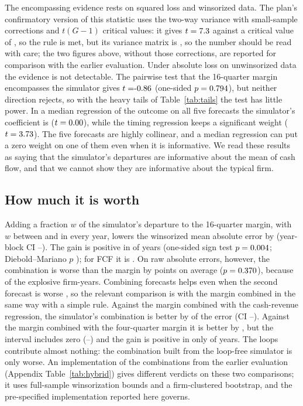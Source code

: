 \documentclass[preprint,12pt,authoryear]{elsarticle}
\begin{document}
The encompassing evidence rests on squared loss and winsorized data. The plan's confirmatory version of this statistic uses the two-way variance with small-sample corrections and $t(G-1)$ critical values: it gives $t=7.3$ against a critical value of \EncTGOneCrit, so the rule is met, but its variance matrix is \EncTGOnePsd, so the number should be read with care; the two figures above, without those corrections, are reported for comparison with the earlier evaluation. Under absolute loss on unwinsorized data the evidence is not detectable. The pairwise test that the 16-quarter margin encompasses the simulator gives $t=\EncAbsSixteen$ (one-sided $p=0.794$), but neither direction rejects, so with the heavy tails of Table~\ref{tab:tails} the test has little power. In a median regression of the outcome on all five forecasts the simulator's coefficient is \EncLadCoef{} ($t=0.00$), while the timing regression keeps a significant weight ($t=3.73$). The five forecasts are highly collinear, and a median regression can put a zero weight on one of them even when it is informative. We read these results as saying that the simulator's departures are informative about the mean of cash flow, and that we cannot show they are informative about the typical firm.

\subsection{How much it is worth}
Adding a fraction $w$ of the simulator's departure to the 16-quarter margin, with $w$ between \LamMin{} and \LamMax{} in every year, lowers the winsorized mean absolute error by \GainPct{} (year-block CI \GainLo--\GainHi). The gain is positive in \GainPos{} of \GainYears{} years (one-sided sign test $p=0.004$; Diebold--Mariano $p$ \GainDmPrel); for FCF it is \GainFcfPct. On raw absolute errors, however, the combination is worse than the margin by \GainRawMean{} points on average ($p=0.370$), because of the explosive firm-years. Combining forecasts helps even when the second forecast is worse \citep{bates1969,clemen1989,timmermann2006}, so the relevant comparison is with the margin combined in the same way with a simple rule. Against the margin combined with the cash-revenue regression, the simulator's combination is better by \GainRegPct{} of the error (CI \GainRegLo--\GainRegHi). Against the margin combined with the four-quarter margin it is better by \GainFourPct, but the interval includes zero (\GainFourLo--\GainFourHi) and the gain is positive in only \GainFourPos{} of \GainYears{} years. The loops contribute almost nothing: the combination built from the loop-free simulator is only \GainLoopsPct{} worse. An implementation of the combinations from the earlier evaluation (Appendix Table~\ref{tab:hybrid}) gives different verdicts on these two comparisons; it uses full-sample winsorization bounds and a firm-clustered bootstrap, and the pre-specified implementation reported here governs.
\end{document}
